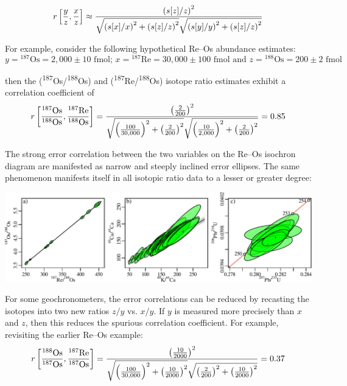 \begin{refsection}
\begin{equation}
  \noindent r\left[\frac{y}{z},\frac{x}{z}\right] \approx
  \frac{
    \left({s[z]}/{z}\right)^2
  }{
    \sqrt{\left({s[x]}/{x}\right)^2 +
      \left({s[z]}/{z}\right)^2}
    \sqrt{\left({s[y]}/{y}\right)^2 +
      \left({s[z]}/{z}\right)^2}
  }
  \label{eq:spurious-conventional}
\end{equation}

For example, consider the following hypothetical Re--Os abundance
estimates:
\[
y = {}^{187}\mbox{Os} = 2,000 \pm 10 \mbox{~fmol;~}
x = {}^{187}\mbox{Re} = 30,000 \pm 100 \mbox{~fmol}
\mbox{~and~}
z = {}^{188}\mbox{Os} = 200 \pm 2 \mbox{~fmol}
\]

\noindent then the (\textsuperscript{187}Os/\textsuperscript{188}Os)
and (\textsuperscript{187}Re/\textsuperscript{188}Os) isotope ratio
estimates exhibit a correlation coefficient of
\[
  \noindent r\left[\frac{{}^{187}\mbox{Os}}{{}^{188}\mbox{Os}},
                   \frac{{}^{187}\mbox{Re}}{{}^{188}\mbox{Os}}\right]
  =
  \frac{
    \left(\frac{2}{200}\right)^2
  }{
    \sqrt{\left(\frac{100}{30,000}\right)^2 +
      \left(\frac{2}{200}\right)^2}
    \sqrt{\left(\frac{10}{2,000}\right)^2 +
      \left(\frac{2}{200}\right)^2}
  }
  = 0.85
\]

The strong error correlation between the two variables on the Re--Os
isochron diagram are manifested as narrow and steeply inclined error
ellipses. The same phenomenon manifests itself in all isotopic ratio
data to a lesser or greater degree:

\noindent\includegraphics[width=\textwidth]{../figures/errorcorrelation_edited.pdf}
\begingroup
{}
\label{fig:errorcorrelation}
\endgroup

For some geochronometers, the error correlations can be reduced by
recasting the isotopes into two new ratios $z/y$ vs. $x/y$. If $y$ is
measured more precisely than $x$ and $z$, then this reduces the
spurious correlation coefficient. For example, revisiting the earlier
Re--Os example:
\[
  \noindent r\left[\frac{{}^{188}\mbox{Os}}{{}^{187}\mbox{Os}},
                   \frac{{}^{187}\mbox{Re}}{{}^{187}\mbox{Os}}\right]
  =
  \frac{
    \left(\frac{10}{2000}\right)^2
  }{
    \sqrt{\left(\frac{100}{30,000}\right)^2 +
      \left(\frac{10}{2000}\right)^2}
    \sqrt{\left(\frac{2}{200}\right)^2 +
      \left(\frac{10}{2000}\right)^2}
  }
  = 0.37
\]


\end{refsection}
